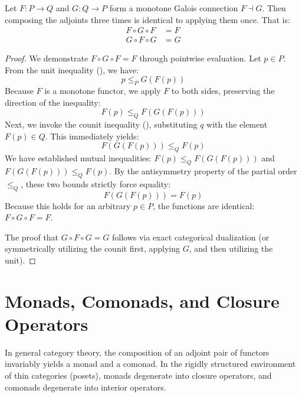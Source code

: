 \begin{theorem}
\label{thm:adjoint_stabilization}
Let $F: P \to Q$ and $G: Q \to P$ form a monotone Galois connection $F \dashv G$. Then composing the adjoints three times is identical to applying them once. That is:
\begin{align}
    F \circ G \circ F &= F \\
    G \circ F \circ G &= G
\end{align}
\end{theorem}
\begin{proof}
We demonstrate $F \circ G \circ F = F$ through pointwise evaluation. Let $p \in P$. 
From the unit inequality (), we have:
\[ p \leq_P G(F(p)) \]
Because $F$ is a monotone functor, we apply $F$ to both sides, preserving the direction of the inequality:
\[ F(p) \leq_Q F(G(F(p))) \]
Next, we invoke the counit inequality (), substituting $q$ with the element $F(p) \in Q$. This immediately yields:
\[ F(G(F(p))) \leq_Q F(p) \]
We have established mutual inequalities: $F(p) \leq_Q F(G(F(p)))$ and $F(G(F(p))) \leq_Q F(p)$. By the antisymmetry property of the partial order $\leq_Q$, these two bounds strictly force equality:
\[ F(G(F(p))) = F(p) \]
Because this holds for an arbitrary $p \in P$, the functions are identical: $F \circ G \circ F = F$.

The proof that $G \circ F \circ G = G$ follows via exact categorical dualization (or symmetrically utilizing the counit first, applying $G$, and then utilizing the unit).
\end{proof}

\section{Monads, Comonads, and Closure Operators}

In general category theory, the composition of an adjoint pair of functors invariably yields a monad and a comonad. In the rigidly structured environment of thin categories (posets), monads degenerate into closure operators, and comonads degenerate into interior operators.


